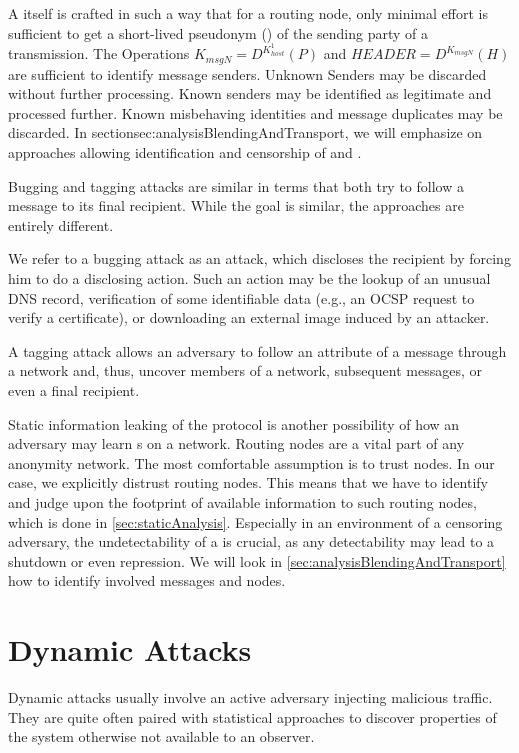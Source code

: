 A \VortexMessage{} itself is crafted in such a way that for a routing node, only minimal effort is sufficient to get a short-lived pseudonym () of the sending party of a transmission. The Operations $ K_{msgN}=D^{K^{1}_{host}}\left(P\right)$ and $HEADER=D^{K_{msgN}}\left(H\right)$ are sufficient to identify message senders. Unknown Senders may be discarded without further processing. Known senders may be identified as legitimate and processed further. Known misbehaving identities and message duplicates may be discarded. In section{sec:analysisBlendingAndTransport}, we will emphasize on approaches allowing identification and censorship of \VortexMessages{} and \VortexNodes.

Bugging and tagging attacks are similar in terms that both try to follow a message to its final recipient. While the goal is similar, the approaches are entirely different.

We refer to a bugging attack as an attack, which discloses the recipient by forcing him to do a disclosing action. Such an action may be the lookup of an unusual DNS record, verification of some identifiable data (e.g., an OCSP request to verify a certificate), or downloading an external image induced by an attacker.

A tagging attack allows an adversary to follow an attribute of a message through a network and, thus, uncover members of a network, subsequent messages, or even a final recipient.

Static information leaking of the protocol is another possibility of how an adversary may learn s on a network. Routing nodes are a vital part of any anonymity network. The most comfortable assumption is to trust nodes. In our case, we explicitly distrust routing nodes. This means that we have to identify and judge upon the footprint of available information to such routing nodes, which is done in \cref{sec:staticAnalysis}. Especially in an environment of a censoring adversary, the undetectability of a \VortexNode{} is crucial, as any detectability may lead to a shutdown or even repression. We will look in \cref{sec:analysisBlendingAndTransport} how to identify involved messages and nodes.

\section{Dynamic Attacks}
Dynamic attacks usually involve an active adversary injecting malicious traffic. They are quite often paired with statistical approaches to discover properties of the system otherwise not available to an observer. 

